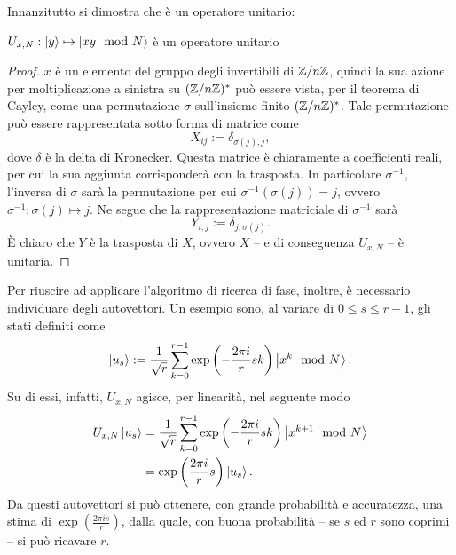 Innanzitutto si dimostra che è un operatore unitario: 
\begin{lem}\label{lem:unitariety}
 $U_{x,N}:\ket{y} \mapsto \ket{xy \mod N}$ è un operatore unitario
\end{lem}
\begin{proof}
 $x$ è un elemento del gruppo degli invertibili di $\mathbb{Z}/{n}\mathbb{Z}$, quindi la sua azione per moltiplicazione a sinistra su $(\mathbb{Z}/{n}\mathbb{Z})^*$ può essere vista, per il teorema di Cayley, come una permutazione $\sigma$ sull'insieme finito $(\mathbb{Z}/{n}\mathbb{Z})^*$.
 Tale permutazione può essere rappresentata sotto forma di matrice come
 \begin{equation}
  X_{ij} := \delta_{\sigma(j),j},
 \end{equation}
 dove $\delta$ è la delta di Kronecker.
 Questa matrice è chiaramente a coefficienti reali, per cui la sua aggiunta corrisponderà con la trasposta.
 In particolare $\sigma^{-1}$, l'inversa di $\sigma$ sarà la permutazione per cui $\sigma^{-1}\left(\sigma(j)\right) = j$, ovvero $\sigma^{-1}: \sigma(j) \mapsto j$.
 Ne segue che la rappresentazione matriciale di $\sigma^{-1}$ sarà 
 \begin{equation}
 Y_{i,j} := \delta_{j,\sigma(j)}.
 \end{equation}
 È chiaro che $Y$ è la trasposta di $X$, ovvero $X$ -- e di conseguenza $U_{x,N}$ -- è unitaria.
\end{proof}
Per riuscire ad applicare l'algoritmo di ricerca di fase, inoltre, è necessario individuare degli autovettori.
Un esempio sono, al variare di $0 \leq s \leq r-1$, gli stati definiti come
\begin{equation}\label{defn:eig_QOF}
 \ket{u_s} := \frac{1}{\sqrt{r}}\sum_{k=0}^{r-1}\exp\left(-\frac{2 \pi i }{r} sk \right)\ket{x^k \mod N}.
\end{equation}
Su di essi, infatti, $U_{x,N}$ agisce, per linearità, nel seguente modo
\begin{align}
 U_{x,N} \ket{u_s} &= \frac{1}{\sqrt{r}}\sum_{k=0}^{r-1}\exp\left(-\frac{2 \pi i }{r} sk \right)\ket{x^{k+1} \mod N}\\
 &= \exp\left(\frac{2 \pi i}{r} s \right)\ket{u_s}.
\end{align}
Da questi autovettori si può ottenere, con grande probabilità e accuratezza, una stima di $\exp\left(\frac{2 \pi i s}{r}\right)$, dalla quale, con buona probabilità -- se $s$ ed $r$ sono coprimi -- si può ricavare $r$.

